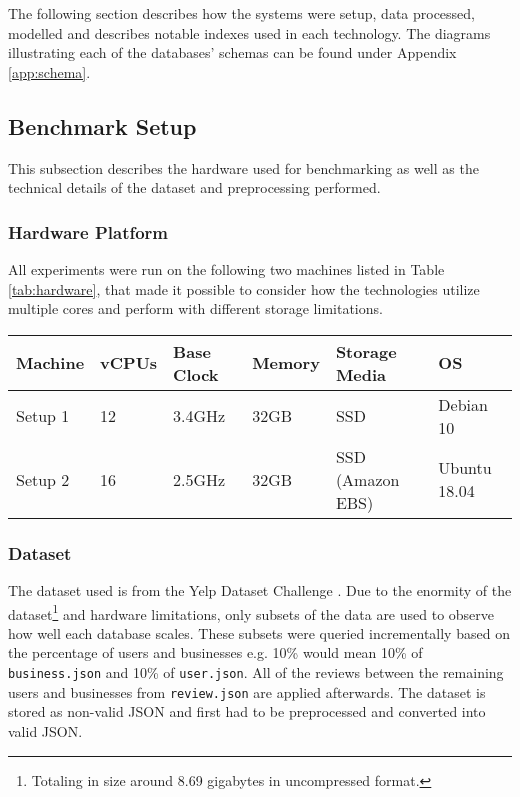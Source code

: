 The following section describes how the systems were setup, data processed, modelled and describes notable indexes used in each technology. The diagrams illustrating each of the databases' schemas can be found under Appendix \ref{app:schema}.

\subsection{Benchmark Setup}

This subsection describes the hardware used for benchmarking as well as the technical details of the dataset and preprocessing performed.

\subsubsection{Hardware Platform}
All experiments were run on the following two machines listed in Table \ref{tab:hardware}, that made it possible to consider how the technologies utilize multiple cores and perform with different storage limitations.

\begin{table*}[h]
    \centering
    \small
    \caption{The specifications of the two machines used to benchmark database performance. Setup 1 makes use of AMD Ryzen 5 2600 whereas Setup 2 is an AWS c5.4xlarge instance with Intel Xeon Platinum 8000 series CPUs.}
    \vspace*{5mm}
    \begin{tabular}{ |p{1.2cm}|p{1.2cm}|p{2cm}|p{1.6cm}|p{2.7cm}|p{2cm}|}
        \hline
        \rowcolor{Gray}
        Machine   & vCPUs & Base Clock & Memory & Storage Media & OS           \\
        \hline
        Setup 1   & 12    & 3.4GHz     & 32GB   & SSD               & Debian 10    \\
        Setup 2   & 16    & 2.5GHz     & 32GB   & SSD (Amazon EBS)  & Ubuntu 18.04 \\
        \hline
    \end{tabular}
    \label{tab:hardware}
\end{table*}

\subsubsection{Dataset}
The dataset used is from the Yelp Dataset Challenge \cite{yelpdataset}. Due to the enormity of the dataset\footnote{Totaling in size around 8.69 gigabytes in uncompressed format.} and hardware limitations, only subsets of the data are used to observe how well each database scales. These subsets were queried incrementally based on the percentage of users and businesses e.g. 10\% would mean 10\% of \texttt{business.json} and 10\% of \texttt{user.json}. All of the reviews between the remaining users and businesses from \texttt{review.json} are applied afterwards. The dataset is stored as non-valid JSON and first had to be preprocessed and converted into valid JSON.

